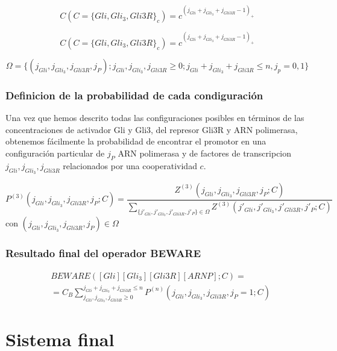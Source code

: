 \begin{equation}
C(C=\{Gli,Gli_3,Gli3R\}_c)=c^{(j_{Gli}+ j_{Gli_3}+ j_{Gli3R}-1)_+}
\end{equation}

\begin{equation}
C(C=\{Gli,Gli_3,Gli3R\}_c)=c^{(j_{Gli}+ j_{Gli_3}+ j_{Gli3R}-1)_+}
\end{equation}


\begin{equation}
\Omega=\{(j_{Gli}, j_{Gli_3}, j_{Gli3R},j_P);j_{Gli}, j_{Gli_3}, j_{Gli3R}\geq0;j_{Gli}+ j_{Gli_3}+ j_{Gli3R}\leq n,j_p=0,1\}
\end{equation}


\subsubsection{Definicion de la probabilidad de cada condiguración}

Una vez que hemos descrito todas las configuraciones posibles en términos de las concentraciones de activador Gli y Gli3, del represor Gli3R y ARN polimerasa, obtenemos fácilmente la probabilidad de encontrar el promotor en una configuración particular de $j_P$ ARN polimerasa y de factores de transcripcion $j_{Gli}, j_{Gli_3}, j_{Gli3R}$ relacionados por una cooperatividad $c$.

\begin{equation}
P^{(3)}(j_{Gli}, j_{Gli_3}, j_{Gli3R},j_P;C)=\frac{Z^{(3)}(j_{Gli}, j_{Gli_3}, j_{Gli3R},j_P;C)}{\sum_{\{j'_{Gli}, j'_{Gli_3}, j'_{Gli3R},j'_P\}\in\Omega}Z^{(3)}(j'_{Gli}, j'_{Gli_3}, j'_{Gli3R},j'_P;C)}
\label{probabilidad}
\end{equation}
 con $(j_{Gli}, j_{Gli_3}, j_{Gli3R},j_P)\in\Omega$
\subsubsection{Resultado final del operador BEWARE}

\begin{equation}
\begin{split}
&BEWARE([Gli][Gli_3][Gli3R][ARNP];C)=\\&=C_B\sum_{j_{Gli}, j_{Gli_3}, j_{Gli3R}\geq0}^{j_{Gli}+ j_{Gli_3}+ j_{Gli3R}\leq n}P^{(n)}(j_{Gli}, j_{Gli_3}, j_{Gli3R},j_P=1;C)
\end{split}
\end{equation}



\section{Sistema final}

